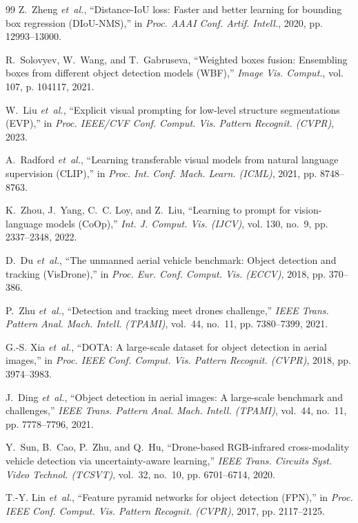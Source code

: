 \documentclass[11pt,a4paper]{article}
\begin{document}
\begin{thebibliography}{99}
Z.~Zheng \emph{et~al.}, ``Distance-IoU loss: Faster and better learning for bounding box regression (DIoU-NMS),'' in \emph{Proc. AAAI Conf. Artif. Intell.}, 2020, pp. 12993--13000.

R.~Solovyev, W.~Wang, and T.~Gabruseva, ``Weighted boxes fusion: Ensembling boxes from different object detection models (WBF),'' \emph{Image Vis. Comput.}, vol. 107, p. 104117, 2021.

W.~Liu \emph{et~al.}, ``Explicit visual prompting for low-level structure segmentations (EVP),'' in \emph{Proc. IEEE/CVF Conf. Comput. Vis. Pattern Recognit. (CVPR)}, 2023.

A.~Radford \emph{et~al.}, ``Learning transferable visual models from natural language supervision (CLIP),'' in \emph{Proc. Int. Conf. Mach. Learn. (ICML)}, 2021, pp. 8748--8763.

K.~Zhou, J.~Yang, C.~C. Loy, and Z.~Liu, ``Learning to prompt for vision-language models (CoOp),'' \emph{Int. J. Comput. Vis. (IJCV)}, vol. 130, no.~9, pp. 2337--2348, 2022.

D.~Du \emph{et~al.}, ``The unmanned aerial vehicle benchmark: Object detection and tracking (VisDrone),'' in \emph{Proc. Eur. Conf. Comput. Vis. (ECCV)}, 2018, pp. 370--386.

P.~Zhu \emph{et~al.}, ``Detection and tracking meet drones challenge,'' \emph{IEEE Trans. Pattern Anal. Mach. Intell. (TPAMI)}, vol.~44, no.~11, pp. 7380--7399, 2021.

G.-S. Xia \emph{et~al.}, ``DOTA: A large-scale dataset for object detection in aerial images,'' in \emph{Proc. IEEE Conf. Comput. Vis. Pattern Recognit. (CVPR)}, 2018, pp. 3974--3983.

J.~Ding \emph{et~al.}, ``Object detection in aerial images: A large-scale benchmark and challenges,'' \emph{IEEE Trans. Pattern Anal. Mach. Intell. (TPAMI)}, vol.~44, no.~11, pp. 7778--7796, 2021.

Y.~Sun, B.~Cao, P.~Zhu, and Q.~Hu, ``Drone-based RGB-infrared cross-modality vehicle detection via uncertainty-aware learning,'' \emph{IEEE Trans. Circuits Syst. Video Technol. (TCSVT)}, vol.~32, no.~10, pp. 6701--6714, 2020.

T.-Y. Lin \emph{et~al.}, ``Feature pyramid networks for object detection (FPN),'' in \emph{Proc. IEEE Conf. Comput. Vis. Pattern Recognit. (CVPR)}, 2017, pp. 2117--2125.


\end{thebibliography}
\end{document}
